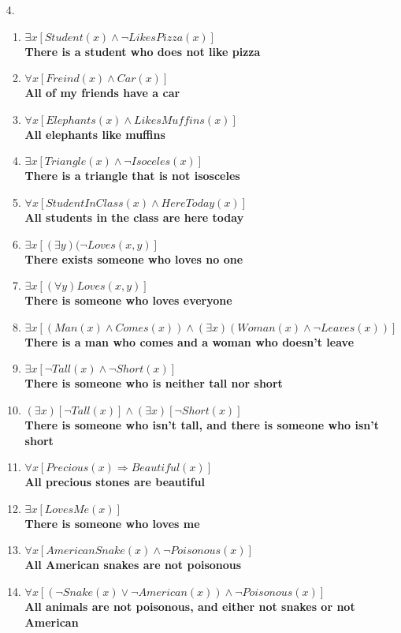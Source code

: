 \documentclass[11pt]{exam}
\begin{document}
\begin{enumerate}[leftmargin=0pt]
\item[4.]
\begin{enumerate}[label=(\alph*)]
    \item $\exists x [Student(x) \land \neg LikesPizza(x)]$ \\
    \textbf{There is a student who does not like pizza}
    \item $\forall x [Freind(x) \land Car(x)]$ \\
    \textbf{All of my friends have a car}
    \item $\forall x [Elephants(x) \land LikesMuffins(x)]$ \\
    \textbf{All elephants like muffins}
    \item $\exists x [Triangle(x) \land \neg Isoceles(x)]$ \\
    \textbf{There is a triangle that is not isosceles}
    \item $\forall x [StudentInClass(x) \land HereToday(x)]$ \\
    \textbf{All students in the class are here today}
    \item $\exists x [(\exists y)(\neg Loves(x,y)]$ \\
    \textbf{There exists someone who loves no one}
    \item $\exists x [(\forall y) Loves(x,y)]$ \\
    \textbf{There is someone who loves everyone}
    \item $\exists x [(Man(x) \land Comes(x)) \land (\exists x)(Woman(x) \land \neg Leaves(x))]$ \\
    \textbf{There is a man who comes and a woman who doesn't leave}
    \item $\exists x [\neg Tall(x) \land \neg Short(x)]$ \\
    \textbf{There is someone who is neither tall nor short}
    \item $(\exists x)[\neg Tall(x)] \land (\exists x)[\neg Short(x)]$ \\
    \textbf{There is someone who isn't tall, and there is someone who isn't short}
    \item $\forall x [Precious(x) \Rightarrow Beautiful(x)]$ \\
    \textbf{All precious stones are beautiful}
    \item $\exists x [LovesMe(x)]$ \\
    \textbf{There is someone who loves me}
    \item $\forall x [AmericanSnake(x) \land \neg Poisonous(x)]$ \\
    \textbf{All American snakes are not poisonous}
    \item $\forall x [(\neg Snake(x) \lor \neg American(x)) \land \neg Poisonous(x)]$ \\
    \textbf{All animals are not poisonous, and either not snakes or not American}
\end{enumerate}


\end{enumerate}
\end{document}
